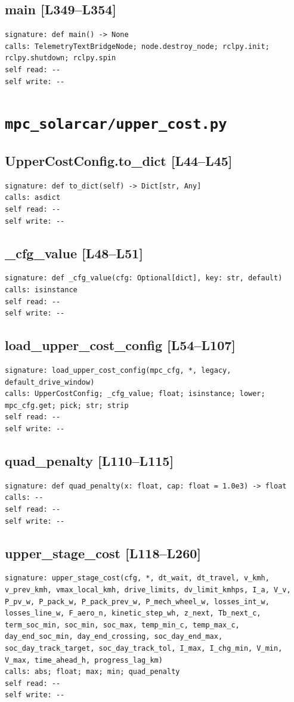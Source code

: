 \documentclass[a4paper,10pt,oneside]{book}
\begin{document}
\subsection*{main [L349--L354]}
\begin{lstlisting}[numbers=none]
signature: def main() -> None
calls: TelemetryTextBridgeNode; node.destroy_node; rclpy.init; rclpy.shutdown; rclpy.spin
self read: --
self write: --
\end{lstlisting}
\section{\texttt{mpc\_solarcar/upper\_cost.py}}
\subsection*{UpperCostConfig.to\_dict [L44--L45]}
\begin{lstlisting}[numbers=none]
signature: def to_dict(self) -> Dict[str, Any]
calls: asdict
self read: --
self write: --
\end{lstlisting}
\subsection*{\_cfg\_value [L48--L51]}
\begin{lstlisting}[numbers=none]
signature: def _cfg_value(cfg: Optional[dict], key: str, default)
calls: isinstance
self read: --
self write: --
\end{lstlisting}
\subsection*{load\_upper\_cost\_config [L54--L107]}
\begin{lstlisting}[numbers=none]
signature: load_upper_cost_config(mpc_cfg, *, legacy, default_drive_window)
calls: UpperCostConfig; _cfg_value; float; isinstance; lower; mpc_cfg.get; pick; str; strip
self read: --
self write: --
\end{lstlisting}
\subsection*{quad\_penalty [L110--L115]}
\begin{lstlisting}[numbers=none]
signature: def quad_penalty(x: float, cap: float = 1.0e3) -> float
calls: --
self read: --
self write: --
\end{lstlisting}
\subsection*{upper\_stage\_cost [L118--L260]}
\begin{lstlisting}[numbers=none]
signature: upper_stage_cost(cfg, *, dt_wait, dt_travel, v_kmh, v_prev_kmh, vmax_local_kmh, drive_limits, dv_limit_kmhps, I_a, V_v, P_pv_w, P_pack_w, P_pack_prev_w, P_mech_wheel_w, losses_int_w, losses_line_w, F_aero_n, kinetic_step_wh, z_next, Tb_next_c, term_soc_min, soc_min, soc_max, temp_min_c, temp_max_c, day_end_soc_min, day_end_crossing, soc_day_end_max, soc_day_track_target, soc_day_track_tol, I_max, I_chg_min, V_min, V_max, time_ahead_h, progress_lag_km)
calls: abs; float; max; min; quad_penalty
self read: --
self write: --
\end{lstlisting}
\end{document}

